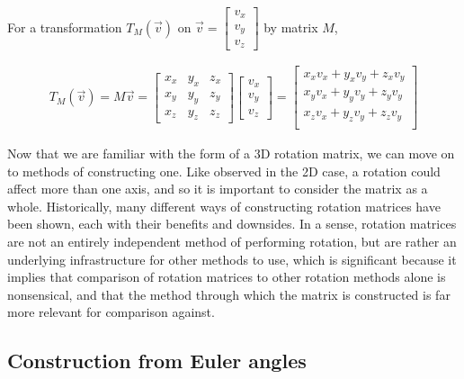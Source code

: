 \documentclass[12pt, a4paper]{article}
\begin{document}
For a transformation $T_M(\vec{v})$ on $\vec{v} = \begin{bmatrix}
        v_x \\
        v_y \\
        v_z \end{bmatrix}$ by matrix $M$,

\begin{align*}
    T_M(\vec{v}) = M\vec{v} = \begin{bmatrix}
                                  {x}_x & {y}_x & {z}_x \\
                                  {x}_y & {y}_y & {z}_y \\
                                  {x}_z & {y}_z & {z}_z
                              \end{bmatrix}
    \begin{bmatrix}
        v_x \\
        v_y \\
        v_z
    \end{bmatrix}
    =
    \begin{bmatrix}
        x_x v_x + y_x v_y + z_x v_y \\
        x_y v_x + y_y v_y + z_y v_y \\
        x_z v_x + y_z v_y + z_z v_y \\
    \end{bmatrix}
\end{align*}

Now that we are familiar with the form of a 3D rotation matrix, we can move on
to methods of constructing one. Like observed in the 2D case, a rotation could
affect more than one axis, and so it is important to consider the matrix as a
whole. Historically, many different ways of constructing rotation matrices have
been shown, each with their benefits and downsides. In a sense, rotation
matrices are not an entirely independent method of performing rotation, but are
rather an underlying infrastructure for other methods to use, which is
significant because it implies that comparison of rotation matrices to other
rotation methods alone is nonsensical, and that the method through which the
matrix is constructed is far more relevant for comparison against.

\subsection{Construction from Euler angles}
\end{document}
